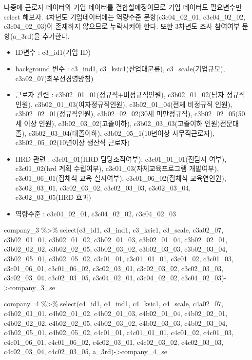 \documentclass[
]{book}
\newenvironment{Shaded}{\begin{snugshade}}{\end{snugshade}}
\newcommand{\FunctionTok}[1]{\textcolor[rgb]{0.00,0.00,0.00}{#1}}
\newcommand{\NormalTok}[1]{#1}
\newcommand{\OtherTok}[1]{\textcolor[rgb]{0.56,0.35,0.01}{#1}}
\newcommand{\SpecialCharTok}[1]{\textcolor[rgb]{0.00,0.00,0.00}{#1}}
\providecommand{\tightlist}{%
  \setlength{\itemsep}{0pt}\setlength{\parskip}{0pt}}
\theoremstyle{definition}
\theoremstyle{definition}
\theoremstyle{definition}
\theoremstyle{definition}
\theoremstyle{remark}
\begin{document}
나중에 근로자 데이터와 기업 데이터를 결합할예정이므로 기업 데이터도 필요변수만 select 해보자. 4차년도 기업데이터에는 역량수준 문항(c3c04\_02\_01, c3c04\_02\_02, c3c04\_02\_03)이 존재하지 않으므로 누락시켜야 한다. 또한 3차년도 조사 참여여부 문항(a\_3rd)을 추가한다.

\begin{itemize}
\tightlist
\item
  ID변수 : c3\_id1(기업 ID)
\item
  background 변수 : c3\_ind1, c3\_ksic1(산업대분류), c3\_scale(기업규모), c3a02\_07(최우선경영방침)
\item
  근로자 관련 : c3b02\_01\_01(정규직+비정규직인원), c3b02\_01\_02(남자 정규직인원), c3b02\_01\_03(여자정규직인원), c3b02\_01\_04(전체 비정규직 인원), c3b02\_02\_01(정규직인원), c3b02\_02\_02(30세 미만정규직), c3b02\_02\_05(50세 이상 인원), c3b02\_03\_02(고졸이하), c3b02\_03\_03(고졸이하 인원)전문대졸), c3b02\_03\_04(대졸이하), c3b02\_05\_1(10년이상 사무직근로자), c3b02\_05\_02(10년이상 생산직 근로자)
\item
  HRD 관련 : c3c01\_01(HRD 담당조직여부), c3c01\_01\_01(전담자 여부), c3c01\_02(hrd 계획 수립여부), c3c01\_03(자체교육프로그램 개발여부), c3c01\_06\_01(집체식 교육 실시여부), c3c01\_06\_02(집체식 교육연인원), c3c02\_03\_01, c3c02\_03\_02, c3c02\_03\_03, c3c02\_03\_04, c3c02\_03\_05(HRD 효과)
\item
  역량수준 : c3c04\_02\_01, c3c04\_02\_02, c3c04\_02\_03
\end{itemize}

\begin{Shaded}
\begin{Highlighting}[]
\NormalTok{company\_3 }\SpecialCharTok{\%\textgreater{}\%} 
  \FunctionTok{select}\NormalTok{(c3\_id1, c3\_ind1, c3\_ksic1, c3\_scale, c3a02\_07, c3b02\_01\_01, c3b02\_01\_02, c3b02\_01\_03, c3b02\_01\_04, c3b02\_02\_01, c3b02\_02\_02, c3b02\_02\_05, c3b02\_03\_02, c3b02\_03\_03, c3b02\_03\_04, c3b02\_05\_01, c3b02\_05\_02, c3c01\_01, c3c01\_01\_01, c3c01\_02, c3c01\_03, c3c01\_06\_01, c3c01\_06\_02, c3c02\_03\_01, c3c02\_03\_02, c3c02\_03\_03, c3c02\_03\_04, c3c02\_03\_05, c3c04\_02\_01, c3c04\_02\_02, c3c04\_02\_03)}\OtherTok{{-}\textgreater{}}\NormalTok{company\_3\_se}

\NormalTok{company\_4 }\SpecialCharTok{\%\textgreater{}\%} 
  \FunctionTok{select}\NormalTok{(c4\_id1, c4\_ind1, c4\_ksic1, c4\_scale, c4a02\_07, c4b02\_01\_01, c4b02\_01\_02, c4b02\_01\_03, c4b02\_01\_04, c4b02\_02\_01, c4b02\_02\_02, c4b02\_02\_05, c4b02\_03\_02, c4b02\_03\_03, c4b02\_03\_04, c4b02\_05\_01, c4b02\_05\_02, c4c01\_01, c4c01\_01\_01, c4c01\_02, c4c01\_03, c4c01\_06\_01, c4c01\_06\_02, c4c02\_03\_01, c4c02\_03\_02, c4c02\_03\_03, c4c02\_03\_04, c4c02\_03\_05, a\_3rd)}\OtherTok{{-}\textgreater{}}\NormalTok{company\_4\_se}
\end{Highlighting}
\end{Shaded}
\end{document}
